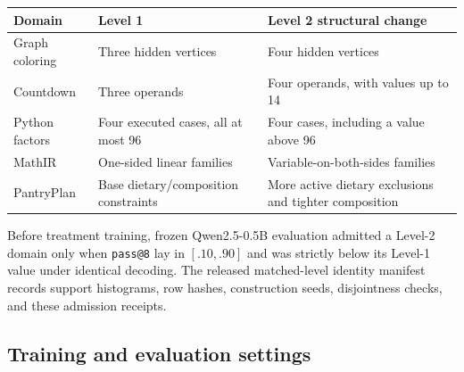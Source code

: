 \documentclass{article}
\newcommand{\1}{\mathbf 1}
\theoremstyle{remark}
\theoremstyle{definition}
\theoremstyle{plain}
\begin{document}
\begin{center}
\small
\begin{tabularx}{.96\linewidth}{@{}lYY@{}}
\toprule
\textbf{Domain} & \textbf{Level 1} & \textbf{Level 2 structural change} \\
\midrule
Graph coloring & Three hidden vertices & Four hidden vertices \\
Countdown & Three operands & Four operands, with values up to 14 \\
Python factors & Four executed cases, all at most 96 & Four cases, including a value above 96 \\
MathIR & One-sided linear families & Variable-on-both-sides families \\
PantryPlan & Base dietary/composition constraints & More active dietary exclusions and tighter composition \\
\bottomrule
\end{tabularx}
\end{center}

Before treatment training, frozen Qwen2.5-0.5B evaluation admitted a Level-2
domain only when \texttt{pass@8} lay in $[.10,.90]$ and was strictly below
its Level-1 value under identical decoding. The released matched-level
identity manifest records support histograms, row hashes, construction
seeds, disjointness checks, and these admission receipts.

\subsection{Training and evaluation settings}
\label{app:repro-run-contract}
\label{app:comparison-design}
\end{document}
